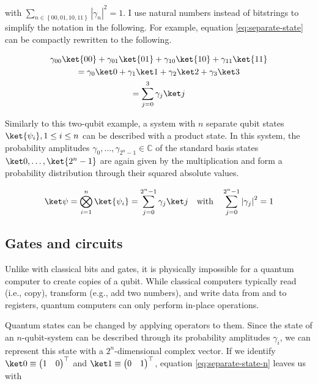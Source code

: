 with $\sum_{n \in \left\{00, 01, 10, 11\right\}} \left|\gamma_n\right|^2 = 1$.
I use natural numbers instead of bitstrings to simplify the notation in the
following.
For example, equation \ref{eq:separate-state} can be compactly rewritten to the
following.

\begin{equation}
    \label{eq:separate-state-natural-numbers}
    \begin{gathered}
            \gamma_{00} \ket{00} + \gamma_{01} \ket{01} + \gamma_{10} \ket{10} + \gamma_{11} \ket{11}\\
        =   \gamma_0 \ket 0 + \gamma_1 \ket 1 + \gamma_2 \ket 2 + \gamma_3 \ket 3\\
        =   \sum_{j=0}^3 \gamma_j \ket j
    \end{gathered}
\end{equation}

Similarly to this two-qubit example, a system with $n$ separate qubit states
$\ket{\psi_i}, 1 \leq i \leq n$ can be described with a product state.
In this system, the probability amplitudes
$\gamma_0, \dots, \gamma_{2^n -1} \in \mathbb C$ of the standard basis states
$\ket 0, \dots, \ket{2^n -1}$ are again given by the multiplication and form a
probability distribution through their squared absolute values.

\begin{equation}
    \label{eq:separate-state-n}
    \ket\psi = \bigotimes_{i=1}^n \ket{\psi_i} = \sum_{j=0}^{2^n -1} \gamma_j \ket j
        \quad\text{with}\quad \sum_{j=0}^{2^n -1} \left|\gamma_j\right|^2 = 1
\end{equation}

\subsection{Gates and circuits}

Unlike with classical bits and gates, it is physically impossible for a quantum
computer to create copies of a qubit.
While classical computers typically read (i.e., copy), transform (e.g., add two
numbers), and write data from and to registers, quantum computers can only
perform in-place operations.

Quantum states can be changed by applying operators to them.
Since the state of an $n$-qubit-system can be described through its probability
amplitudes $\gamma_i$, we can represent this state with a $2^n$-dimensional
complex vector.
If we identify $\ket 0 \equiv \begin{pmatrix}1 & 0\end{pmatrix}^\top$ and
$\ket 1 \equiv \begin{pmatrix}0 & 1\end{pmatrix}^\top$,
equation \ref{eq:separate-state-n} leaves us with

